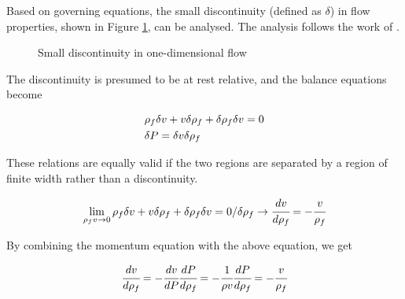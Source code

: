 \documentclass[../Article_Sensitivity_Analsysis.tex]{subfiles}
\begin{document}
	Based on governing equations, the small discontinuity (defined as $\delta$) in flow properties, shown in Figure \ref{fig: Discontinuity_slow_flow}, can be analysed. The analysis follows the work of \citet{Schreier1982}.
	
	\begin{figure}[!h]
		\centering
		\caption{Small discontinuity in one-dimensional flow}
		\label{fig: Discontinuity_slow_flow}
	\end{figure} 
	
	The discontinuity is presumed to be at rest relative, and the balance equations become		
	
	{\footnotesize
		\begin{align*}
			&{\color{black}\rho_f} \delta v + v \delta {\color{black}\rho_f} + \delta {\color{black}\rho_f} \delta v = 0 \\
			&\delta {\color{black}P} = \delta v \delta {\color{black}\rho_f}
		\end{align*}
	}
	
	These relations are equally valid if the two regions are separated by a region of finite width rather than a discontinuity. 
	
	{\footnotesize
		\begin{equation*}
			\lim_{{\color{black}\rho_f} v \rightarrow 0} {\color{black}\rho_f} \delta v + v \delta {\color{black}\rho_f} + \delta {\color{black}\rho_f} \delta v = 0 / \delta {\color{black}\rho_f} \rightarrow \cfrac{d v}{d {\color{black}\rho_f}} = - \cfrac{v}{{\color{black}\rho_f}}
		\end{equation*}
	}
	
	By combining the momentum equation with the above equation, we get
	
	{\footnotesize
		\begin{equation} \label{EQ: Pressure_Velocity}
			\cfrac{d v}{d {\color{black}\rho_f}} = - \cfrac{d v}{d{\color{black}P}} \cfrac{d {\color{black}P}}{d {\color{black}\rho_f}} = -\cfrac{1}{\rho v} \cfrac{d{\color{black}P}}{d{\color{black}\rho_f}} = -\cfrac{v}{{\color{black}\rho_f}}
		\end{equation}
	}
	
\end{document}
